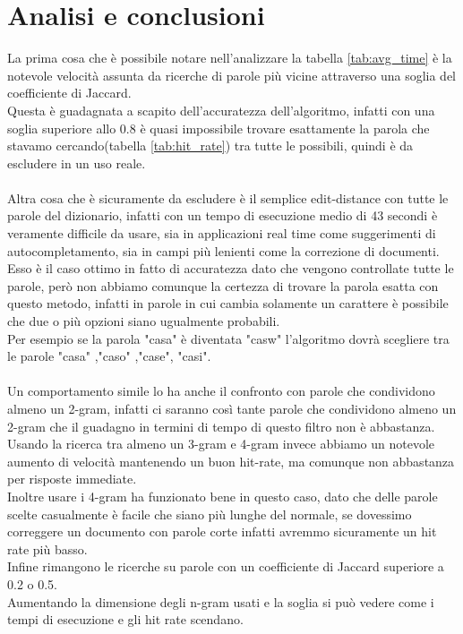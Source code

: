 \documentclass[]{article}
\begin{document}
\section{Analisi e conclusioni}
La prima cosa che è possibile notare nell'analizzare la tabella \ref{tab:avg_time} è la notevole velocità assunta da ricerche di parole più vicine attraverso una soglia del coefficiente di Jaccard.\\
Questa è guadagnata a scapito dell'accuratezza dell'algoritmo, infatti con una soglia superiore allo 0.8 è quasi impossibile trovare esattamente la parola che stavamo cercando(tabella \ref{tab:hit_rate}) tra tutte le possibili, quindi è da escludere in un uso reale.\\\\
Altra cosa che è sicuramente da escludere è il semplice edit-distance con tutte le parole del dizionario, infatti con un tempo di esecuzione medio di 43 secondi è veramente difficile da usare, sia in applicazioni real time come suggerimenti di autocompletamento, sia in campi più lenienti come la correzione di documenti.\\
Esso è il caso ottimo in fatto di accuratezza dato che vengono controllate tutte le parole, però non abbiamo comunque la certezza di trovare la parola esatta con questo metodo, infatti in parole in cui cambia solamente un carattere è possibile che due o più opzioni siano ugualmente probabili.\\
Per esempio se la parola "casa" è diventata "casw" l'algoritmo dovrà scegliere tra le parole "casa" ,"caso" ,"case", "casi".\\\\
Un comportamento simile lo ha anche il confronto con parole che condividono almeno un 2-gram, infatti ci saranno così tante parole che condividono almeno un 2-gram che il guadagno in termini di tempo di questo filtro non è abbastanza.
Usando la ricerca tra almeno un 3-gram e 4-gram invece abbiamo un notevole aumento di velocità mantenendo un buon hit-rate, ma comunque non abbastanza per risposte immediate.\\
Inoltre usare i 4-gram ha funzionato bene in questo caso, dato che delle parole scelte casualmente è facile che siano più lunghe del normale, se dovessimo correggere un documento con parole corte infatti avremmo sicuramente un hit rate più basso.\\
Infine rimangono le ricerche su parole con un coefficiente di Jaccard superiore a 0.2 o 0.5.\\
Aumentando la dimensione degli n-gram usati e la soglia si può vedere come i tempi di esecuzione e gli hit rate scendano.\\\\
\end{document}
